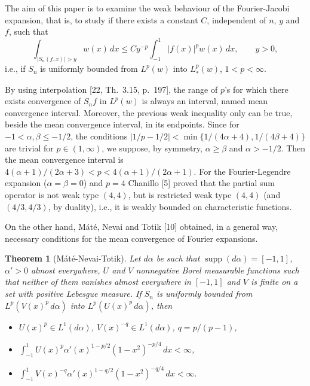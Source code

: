 \documentclass[10pt,a4paper]{article}
\newcommand{\supp}{\operatorname{supp}}
\theoremstyle{plain}
\newtheorem*{theoremMNT}{Theorem}
\theoremstyle{remark}
\begin{document}
The aim of this paper is to examine the weak behaviour of the
Fourier-Jacobi expansion, that is, to study if there exists a
constant $C$, independent of $n$, $y$ and $f$, such that
$$
\int_{|S_{n}(f,x)| > y} w(x)\,dx
\leq Cy^{-p} \int_{-1}^{1} |f(x)|^{p}w(x)\,dx,
\qquad y > 0,
$$
i.e., if $S_{n}$ is uniformly bounded from $L^{p}(w)$ into $L^{p}_{*}(w)$,
$1 < p < \infty$.

By using interpolation [22, Th.~3.15, p.~197], the range of $p$'s
for which there exists convergence of $S_{n}f$ in $L^{p}(w)$ is always
an interval, named mean convergence interval. Moreover, the previous
weak inequality only can be true, beside the mean convergence
interval, in its endpoints. Since for $-1 < \alpha, \beta \leq -1/2$,
the conditions $|1/p-1/2| < \min\{1/(4\alpha+4),1/(4\beta+4)\}$
are trivial for $p \in (1,\infty)$, we suppose, by symmetry,
$\alpha \geq \beta$ and $\alpha > -1/2$. Then
the mean convergence interval is
$4(\alpha+1)/(2\alpha+3) < p < 4(\alpha+1)/(2\alpha+1)$.
For the Fourier-Legendre
expansion ($\alpha = \beta = 0$) and $p = 4$ Chanillo [5]
proved that the partial sum operator is not weak type $(4,4)$,
but is restricted weak type $(4,4)$ (and $(4/3,4/3)$, by duality),
i.e., it is weakly bounded on characteristic functions.

On the other hand, M\'{a}t\'{e}, Nevai and Totik [10] obtained, in
a general way, necessary conditions for the mean convergence
of Fourier expansions.

\begin{theoremMNT}[M\'at\'e-Nevai-Totik]
Let $d\alpha$ be such that
$\supp(d\alpha) = [-1,1]$, $\alpha' > 0$ almost everywhere,
$U$ and $V$ nonnegative Borel measurable functions such that neither
of them vanishes almost everywhere in $[-1,1]$ and $V$ is finite
on a set with positive Lebesgue measure. If $S_{n}$ is uniformly
bounded from $L^{p}(V(x)^{p}\,d\alpha)$ into $L^{p}(U(x)^{p}\,d\alpha)$,
then
\begin{itemize}
\item[(i)] $U(x)^{p} \in L^{1}(d\alpha)$, $V(x)^{-q} \in L^{1}(d\alpha)$,
$q = p/(p-1)$,
\item[(ii)] $\displaystyle \int_{-1}^{1} U(x)^{p}\alpha'(x)^{1-p/2} (1-x^{2})^{-p/4}\,dx
< \infty$,
\item[(iii)] $\displaystyle \int_{-1}^{1} V(x)^{-q}\alpha'(x)^{1-q/2} (1-x^{2})^{-q/4}\,dx
< \infty.$
\end{itemize}
\end{theoremMNT}
\end{document}
